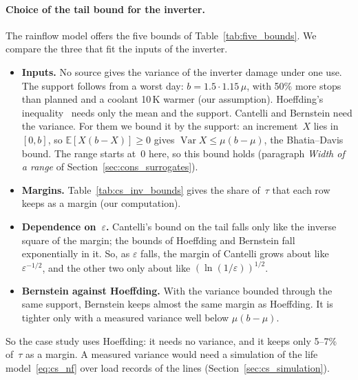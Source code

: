 \documentclass[11pt,a4paper]{article}
\theoremstyle{plain}
\theoremstyle{definition}
\theoremstyle{remark}
\begin{document}
\paragraph{Choice of the tail bound for the inverter.}
The rainflow model offers the five bounds of Table~\ref{tab:five_bounds}.
We compare the three that fit the inputs of the inverter.
\begin{itemize}
  \item \textbf{Inputs.}
    No source gives the variance of the inverter damage under one use.
    The support follows from a worst day: $b = 1.5 \cdot 1.15\,\mu$, with 50\% more stops than planned and a coolant 10\,K warmer (our assumption).
    Hoeffding's inequality~\cite{Hoeffding1963} needs only the mean and the support.
    Cantelli and Bernstein need the variance.
    For them we bound it by the support: an increment~$X$ lies in $[0, b]$, so $\mathbb{E}[X(b - X)] \ge 0$ gives $\operatorname{Var} X \le \mu(b - \mu)$, the Bhatia--Davis bound.
    The range starts at~$0$ here, so this bound holds (paragraph \emph{Width of a range} of Section~\ref{sec:cons_surrogates}).
  \item \textbf{Margins.}
    Table~\ref{tab:cs_inv_bounds} gives the share of~$\tau$ that each row keeps as a margin (our computation).
  \item \textbf{Dependence on~$\varepsilon$.}
    Cantelli's bound on the tail falls only like the inverse square of the margin; the bounds of Hoeffding and Bernstein fall exponentially in it.
    So, as $\varepsilon$ falls, the margin of Cantelli grows about like $\varepsilon^{-1/2}$, and the other two only about like $(\ln(1/\varepsilon))^{1/2}$.
  \item \textbf{Bernstein against Hoeffding.}
    With the variance bounded through the same support, Bernstein keeps almost the same margin as Hoeffding.
    It is tighter only with a measured variance well below $\mu(b - \mu)$.
\end{itemize}
So the case study uses Hoeffding: it needs no variance, and it keeps only 5--7\% of~$\tau$ as a margin.
A measured variance would need a simulation of the life model~\eqref{eq:cs_nf} over load records of the lines (Section~\ref{sec:cs_simulation}).
\end{document}
